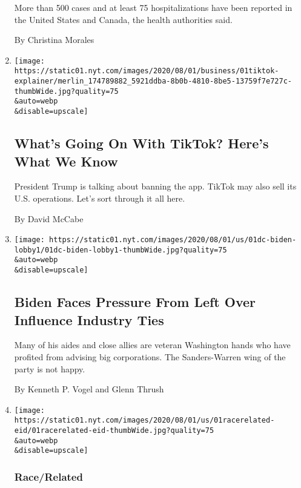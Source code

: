 \begin{enumerate}
  More than 500 cases and at least 75 hospitalizations have been
  reported in the United States and Canada, the health authorities said.

  By Christina Morales
\item
  \href{/2020/08/01/technology/tiktok-trump-microsoft-bytedance-china-ban.html}{}

  \texttt{[image: https://static01.nyt.com/images/2020/08/01/business/01tiktok-explainer/merlin\_174789882\_5921ddba-8b0b-4810-8be5-13759f7e727c-thumbWide.jpg?quality=75\\\&auto=webp\\\&disable=upscale]}

  \hypertarget{whats-going-on-with-tiktok-heres-what-we-know}{%
  \subsection{What's Going On With TikTok? Here's What We
  Know}\label{whats-going-on-with-tiktok-heres-what-we-know}}

  President Trump is talking about banning the app. TikTok may also sell
  its U.S. operations. Let's sort through it all here.

  By David McCabe
\item
  \href{/2020/08/01/us/politics/biden-lobbyist-ties.html}{}

  \texttt{[image: https://static01.nyt.com/images/2020/08/01/us/01dc-biden-lobby1/01dc-biden-lobby1-thumbWide.jpg?quality=75\\\&auto=webp\\\&disable=upscale]}

  \hypertarget{biden-faces-pressure-from-left-over-influence-industry-ties}{%
  \subsection{Biden Faces Pressure From Left Over Influence Industry
  Ties}\label{biden-faces-pressure-from-left-over-influence-industry-ties}}

  Many of his aides and close allies are veteran Washington hands who
  have profited from advising big corporations. The Sanders-Warren wing
  of the party is not happy.

  By Kenneth P. Vogel and Glenn Thrush
\item
  \href{/2020/08/01/us/eid-al-adha-coronavirus.html}{}

  \texttt{[image: https://static01.nyt.com/images/2020/08/01/us/01racerelated-eid/01racerelated-eid-thumbWide.jpg?quality=75\\\&auto=webp\\\&disable=upscale]}

  \hypertarget{racerelated-1}{%
  \subsubsection{Race/Related}\label{racerelated-1}}


\end{enumerate}
